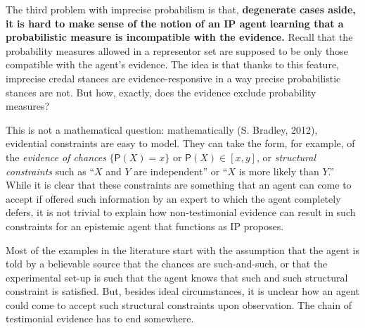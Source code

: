 \documentclass[
  10pt,
  dvipsnames,enabledeprecatedfontcommands]{scrartcl}
\begin{document}
The third problem with imprecise probabilism is that, \textbf{degenerate
cases aside, it is hard to make sense of the notion of an IP agent
learning that a probabilistic measure is incompatible with the
evidence.} Recall that the probability measures allowed in a representor
set are supposed to be only those compatible with the agent's evidence.
The idea is that thanks to this feature, imprecise credal stances are
evidence-responsive in a way precise probabilistic stances are not. But
how, exactly, does the evidence exclude probability measures?

This is not a mathematical question: mathematically (S. Bradley, 2012),
evidential constraints are easy to model. They can take the form, for
example, of the \emph{evidence of chances} \(\{ \mathsf{P}(X) = x\}\) or
\(\mathsf{P}(X) \in [x,y]\), or \emph{structural constraints} such as
``\(X\) and \(Y\) are independent'' or ``\(X\) is more likely than
\(Y\).'' While it is clear that these constraints are something that an
agent can come to accept if offered such information by an expert to
which the agent completely defers, it is not trivial to explain how
non-testimonial evidence can result in such constraints for an epistemic
agent that functions as IP proposes.

Most of the examples in the literature start with the assumption that
the agent is told by a believable source that the chances are
such-and-such, or that the experimental set-up is such that the agent
knows that such and such structural constraint is satisfied. But,
besides ideal circumstances, it is unclear how an agent could come to
accept such structural constraints upon observation. The chain of
testimonial evidence has to end somewhere.
\end{document}
